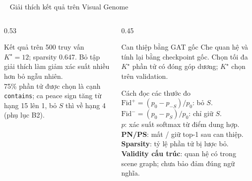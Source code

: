 \documentclass[aspectratio=169,10pt]{beamer}
\newcommand{\leveltag}[2]{%
  \tikz[baseline=(x.base)]{\node[fill=#1,text=white,inner xsep=5pt,inner ysep=1.5pt,
    rounded corners=2pt,font=\scriptsize\bfseries](x){#2};}\ %
}
\begin{document}
\begin{frame}{\leveltag{L1Blue}{CẤP ĐỘ 1} Giải thích kết quả trên Visual Genome}
  \begin{columns}[c]
    \begin{column}{0.53\textwidth}
      \centering
      \resizebox{0.97\linewidth}{!}{}
      \begin{exampleblock}{Kết quả trên 500 truy vấn}\footnotesize
        $K^\star=12$; sparsity 0.647. Bỏ tập giải thích làm giảm xác suất nhiều hơn bỏ ngẫu nhiên.\\[0.08cm]
        75\% phần tử được chọn là cạnh \texttt{contains}; ca peace sign tăng từ hạng 15 lên 1, bỏ $S$ thì về hạng 4 (phụ lục B2).
      \end{exampleblock}
    \end{column}
    \begin{column}{0.45\textwidth}
      \begin{block}{Can thiệp bằng GAT gốc}\footnotesize
        Che quan hệ và tính lại bằng checkpoint gốc. Chọn tối đa $K^\star$ phần tử có đóng góp dương; $K^\star$ chọn trên validation.
      \end{block}
      \begin{block}{Cách đọc các thước đo}\footnotesize
        $\mathrm{Fid}^{+}=(p_0-p_{-S})/p_0$: bỏ $S$.\\[0.04cm]
        $\mathrm{Fid}^{-}=(p_0-p_S)/p_0$: chỉ giữ $S$.\\[0.04cm]
        $p$: xác suất softmax từ điểm dung hợp.\\
        \textbf{PN/PS}: mất / giữ top-1 sau can thiệp.\\
        \textbf{Sparsity}: tỷ lệ phần tử bị lược bỏ.\\
        \textbf{Validity cấu trúc}: quan hệ có trong scene graph; chưa bảo đảm đúng ngữ nghĩa.
      \end{block}
    \end{column}
  \end{columns}
\end{frame}
\end{document}

